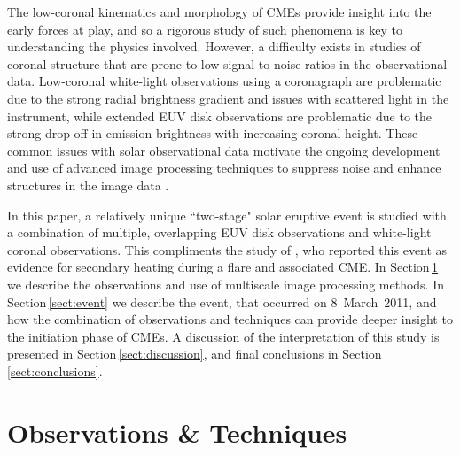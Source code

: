 \documentclass[namedreferences]{solarphysics}
\begin{document}
\begin{article}
The low-coronal kinematics and morphology of CMEs provide insight into the early forces at play, and so a rigorous study of such phenomena is key to understanding the physics involved. However, a difficulty exists in studies of coronal structure that are prone to low signal-to-noise ratios in the observational data. Low-coronal white-light observations using a coronagraph are problematic due to the strong radial brightness gradient and issues with scattered light in the instrument, while extended EUV disk observations are problematic due to the strong drop-off in emission brightness with increasing coronal height. These common issues with solar observational data motivate the ongoing development and use of advanced image processing techniques to suppress noise and enhance structures in the image data \cite{2003A&A...398.1185S,2006SoPh..236..263M,2008SoPh..248..457Y,2011igi-global,2011ApJ...737...88D}. 

In this paper, a relatively unique ``two-stage" solar eruptive event is studied with a combination of multiple, overlapping EUV disk observations and white-light coronal observations. This compliments the study of , who reported this event as evidence for secondary heating during a flare and associated CME. In Section\,\ref{sect:techniques} we describe the observations and use of multiscale image processing methods. In Section\,\ref{sect:event} we describe the event, that occurred on 8~March~2011, and how the combination of observations and techniques can provide deeper insight to the initiation phase of CMEs. A discussion of the interpretation of this study is presented in Section\,\ref{sect:discussion}, and final conclusions in Section\,\ref{sect:conclusions}.

\section{Observations \& Techniques}
\label{sect:techniques}



\end{article}
\end{document}
